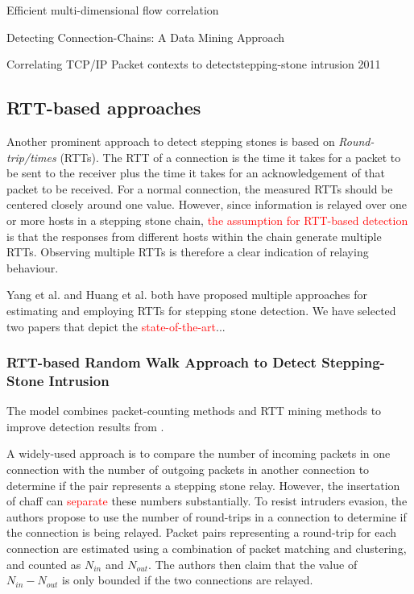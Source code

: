 \documentclass[conference]{IEEEtran}\usepackage[]{graphicx}\usepackage[]{color}
\begin{document}
Efficient multi-dimensional flow correlation

Detecting Connection-Chains: A Data Mining Approach

Correlating TCP/IP Packet contexts to detectstepping-stone intrusion 2011

\subsection{RTT-based approaches}

Another prominent approach to detect stepping stones is based on \textit{Round-trip/times} (RTTs). The RTT of a connection is the time it takes for a packet to be sent to the receiver plus the time it takes for an acknowledgement of that packet to be received. For a normal connection, the measured RTTs should be centered closely around one value. However, since information is relayed over one or more hosts in a stepping stone chain, \textcolor{red}{the assumption for RTT-based detection} is that the responses from different hosts within the chain generate multiple RTTs. Observing multiple RTTs is therefore a clear indication of relaying behaviour.

Yang et al. \cite{yang2015rtt,yang2007mining} and Huang et al. \cite{huang2016detecting,ding2009detecting,huang2007stepping}  both have proposed multiple approaches for estimating and employing RTTs for stepping stone detection. We have selected two papers that depict the \textcolor{red}{state-of-the-art}...

\subsubsection{RTT-based Random Walk Approach to Detect Stepping-Stone Intrusion \cite{yang2015rtt}}


The model combines packet-counting methods and RTT mining methods to improve detection results from \cite{yang2007mining}. 

A widely-used approach is to compare the number of incoming packets in one connection with the number of outgoing packets in another connection  to determine if the pair represents a stepping stone relay. However, the insertation of chaff can \textcolor{red}{separate} these numbers substantially. 
To resist intruders  evasion,  the authors  propose  to use the  number of  round-trips in  a  connection  to  determine  if  the  connection  is being  relayed.
Packet pairs representing a round-trip for each connection are estimated using a combination of packet matching and clustering, and counted as $N_{in}$ and $N_{out}$. The authors then claim that the value of $N_{in}-N_{out}$ is only bounded if the two connections are relayed.
\end{document}
